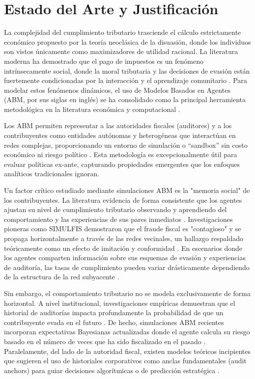 \documentclass[twocolumn,10pt,letterpaper]{article}
\begin{document}
\section{Estado del Arte y Justificación}

La complejidad del cumplimiento tributario trasciende el cálculo estrictamente económico propuesto por la teoría neoclásica de la disuasión, donde los individuos son vistos únicamente como maximizadores de utilidad racional. La literatura moderna ha demostrado que el pago de impuestos es un fenómeno intrínsecamente social, donde la moral tributaria y las decisiones de evasión están fuertemente condicionadas por la interacción y el aprendizaje comunitario \parencite{bloomquist2011tax}. Para modelar estos fenómenos dinámicos, el uso de Modelos Basados en Agentes (ABM, por sus siglas en inglés) se ha consolidado como la principal herramienta metodológica en la literatura económica y computacional \parencite{hokamp2010income}.

Los ABM permiten representar a las autoridades fiscales (auditores) y a los contribuyentes como entidades autónomas y heterogéneas que interactúan en redes complejas, proporcionando un entorno de simulación o ``sandbox'' sin costo económico ni riesgo político \parencite{andrei2014agent}. Esta metodología es excepcionalmente útil para evaluar políticas ex-ante, capturando propiedades emergentes que los enfoques analíticos tradicionales ignoran.

Un factor crítico estudiado mediante simulaciones ABM es la "memoria social" de los contribuyentes. La literatura evidencia de forma consistente que los agentes ajustan su nivel de cumplimiento tributario observando y aprendiendo del comportamiento y las experiencias de sus pares inmediatos \parencite{arslan2013effects}. Investigaciones pioneras como SIMULFIS \parencite{llacer2018simulfis, noguera2014tax} demostraron que el fraude fiscal es "contagioso" y se propaga horizontalmente a través de las redes vecinales, un hallazgo respaldado teóricamente como un efecto de imitación y conformidad \parencite{chica2021evolutionary, garcia2019effects}. En escenarios donde los agentes comparten información sobre sus esquemas de evasión y experiencias de auditoría, las tasas de cumplimiento pueden variar drásticamente dependiendo de la estructura de la red subyacente \parencite{garcia2019network}.

Sin embargo, el comportamiento tributario no se modela exclusivamente de forma horizontal. A nivel institucional, investigaciones empíricas demuestran que el historial de auditorías impacta profundamente la probabilidad de que un contribuyente evada en el futuro \parencite{alm2020audit}. De hecho, simulaciones ABM recientes incorporan expectativas Bayesianas actualizadas donde el agente calcula su riesgo basado en el número de veces que ha sido fiscalizado en el pasado \parencite{kuchumova2025tax, rand2019agent}. Paralelamente, del lado de la autoridad fiscal, existen modelos teóricos incipientes que sugieren el uso de historiales corporativos como anclas fundamentales (audit anchors) para guiar decisiones algorítmicas o de predicción estratégica \parencite{bachas2025algorithms, lopez2025laam, rablen2015predictive}. 
\end{document}
